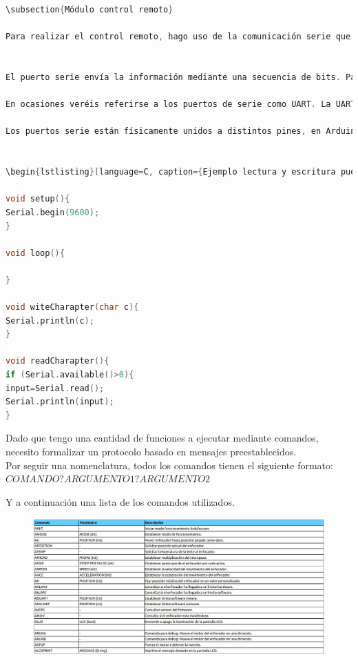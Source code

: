 \begin{lstlisting}[language=cpp, caption={Núcleo implementación firmware  ardufocuser},label={lst:nucleo_firmware_ardufocuser}]
\subsection{Módulo control remoto}

Para realizar el control remoto, hago uso de la comunicación serie que incorpora la placa Arduino.


El puerto serie envía la información mediante una secuencia de bits. Para ello se necesitan al menos dos conectores para realizar la comunicación de datos, RX (recepción) y TX (transmisión). 

En ocasiones veréis referirse a los puertos de serie como UART. La UART (universally asynchronous receiver/transmitter) es una unidad que incorporan ciertos procesadores, encargada de realiza la conversión de los datos a una secuencia de bits y transmitirlos o recibirlos a una velocidad determinada.

Los puertos serie están físicamente unidos a distintos pines, en Arduino UNO y Mini Pro los pines empleados son 0 (RX) y 1 (TX).


\begin{lstlisting}[language=C, caption={Ejemplo lectura y escritura puerto serie},label={lst:write_read_serial_port_sample}]

void setup(){
Serial.begin(9600);
}

void loop(){

}

void witeCharapter(char c){
Serial.println(c);
}

void readCharapter(){
if (Serial.available()>0){
input=Serial.read();
Serial.println(input);
}


\end{lstlisting}


Dado que tengo una cantidad de funciones a ejecutar mediante comandos, necesito formalizar un protocolo basado en mensajes preestablecidos. \\
Por seguir una nomenclatura, todos los comandos tienen el siguiente formato: \\


$ COMANDO?ARGUMENTO1?ARGUMENTO2  $

Y a continuación una lista de los comandos utilizados.


\begin{figure}[h]
	\centering
	\includegraphics[width=1.1\linewidth]{../images/comando_ardufocuser}
	\caption{}
	\label{fig:comando_ardufocuser}
\end{figure}

